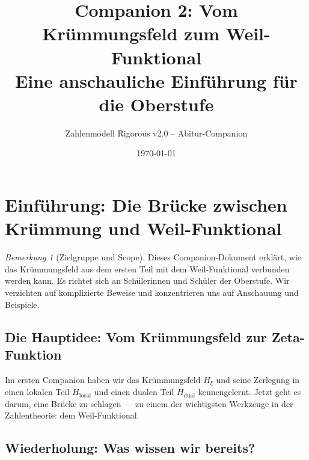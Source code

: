 \documentclass[11pt,a4paper]{article}
\title{Companion 2: Vom Kr\"ummungsfeld zum Weil-Funktional\\
	\large Eine anschauliche Einf\"uhrung f\"ur die Oberstufe}
\author{Zahlenmodell Rigorous v2.0 -- Abitur-Companion}
\date{\today}
\theoremstyle{plain}
\theoremstyle{definition}
\theoremstyle{remark}
\newtheorem{remark}[theorem]{Bemerkung}
\newcommand{\Hxi}{H_{\xi}}
\newcommand{\Hlocal}{H_{\mathrm{local}}}
\newcommand{\Hdual}{H_{\mathrm{dual}}}
\begin{document}
	\maketitle
	\thispagestyle{empty}
	\tableofcontents
	\clearpage
	
	
	\section{Einf\"uhrung: Die Br\"ucke zwischen Kr\"ummung und Weil-Funktional}\label{sec:einfuehrung}
	
	\begin{remark}[Zielgruppe und Scope]
		Dieses Companion-Dokument erkl\"art, wie das Kr\"ummungsfeld aus dem ersten Teil
		mit dem Weil-Funktional verbunden werden kann. Es richtet sich an
		Sch\"ulerinnen und Sch\"uler der Oberstufe. Wir verzichten auf
		komplizierte Beweise und konzentrieren uns auf Anschauung und Beispiele.
	\end{remark}
	
	\subsection{Die Hauptidee: Vom Kr\"ummungsfeld zur Zeta-Funktion}
	
	Im ersten Companion haben wir das Kr\"ummungsfeld $\Hxi$ und seine Zerlegung in
	einen lokalen Teil $\Hlocal$ und einen dualen Teil $\Hdual$ kennengelernt.
	Jetzt geht es darum, eine Br\"ucke zu schlagen --- zu einem der wichtigsten
	Werkzeuge in der Zahlentheorie: dem Weil-Funktional.
	
	\begin{center}
	\end{center}
	
	\subsection{Wiederholung: Was wissen wir bereits?}
	
\end{document}
